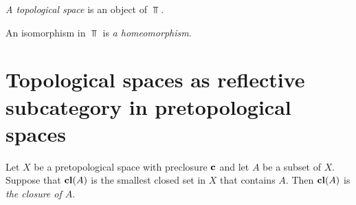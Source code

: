 \begin{definition}
	\textit{A topological space} is an object of $\Top$.
\end{definition}

\begin{definition}
	An isomorphism in $\Top$ is \textit{a homeomorphism}.
\end{definition}

\section{Topological spaces as reflective subcategory in pretopological spaces}

\begin{definition}
	Let $X$ be a pretopological space with preclosure $\mathbf{c}$ and let $A$ be a subset of $X$. Suppose that $\mathbf{cl}(A)$ is the smallest closed set in $X$ that contains $A$. Then $\mathbf{cl}(A)$ is \textit{the closure of $A$}.
\end{definition}

